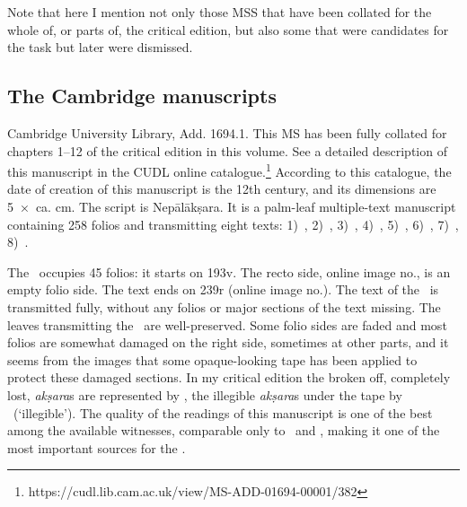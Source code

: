Note that here I mention not only those MSS that
have been collated for the whole of, or parts of,
the critical edition, but also some that were candidates
for the task but later were dismissed.




\medskip
\label{mss_descr}
\subsection{The Cambridge manuscripts}

Cambridge University Library, Add. 1694.1. This MS has been 
fully collated for chapters 1--12 of the critical edition in this volume. 
See a detailed description of this manuscript in the 
CUDL online catalogue.\footnote{https://cudl.lib.cam.ac.uk/view/MS-ADD-01694-00001/382}
According to this catalogue, the date of creation of this manuscript 
is the 12th century, and its dimensions are 5~×~ca. cm. 
The script is Nepālākṣara. It is a palm-leaf multiple-text manuscript containing 258
folios and transmitting eight texts: 
1)~\SDhS,
2)~\SDhU,
3)~\SDhSangr,
4)~\Ums,
5)~\Uums, 
6)~\Vss,
7)~\DharmP,
8)~\SivaUp.

The \VSS\ occupies 45 folios: it starts on \fol193v. 
The recto side, online image no., is an empty folio side. 
The text ends on \fol239r (online image no.). 
The text of the \VSS\ is transmitted fully,
without any folios or major sections of the text missing. The leaves
transmitting the \VSS\ are well-preserved. Some folio sides are faded and
most folios are somewhat damaged on the right side, 
sometimes at other parts, and it seems from the images 
that some opaque-looking tape has been applied to protect these damaged sections. 
In my critical edition the broken off, completely lost, 
\emph{akṣara}s are represented by \lac,
the illegible \emph{akṣara}s under the tape by \lk\ (`illegible'). The
quality of the readings of this manuscript is one of the best among
the available witnesses, comparable only to \msNa\ and \msParis, 
making it one of the most important sources for the \VSS.


